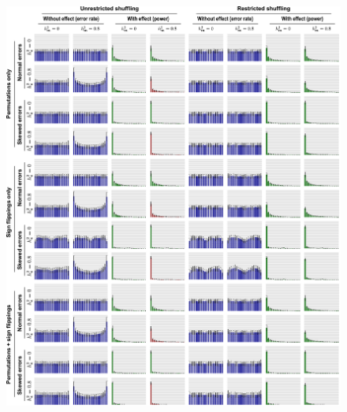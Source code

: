 \begin{figure}[!p]
\centering
\hspace*{-5mm}\includegraphics[scale=.9]{figures/errorrates.pdf}
\label{fig:errorrates_noref}
\end{figure}

